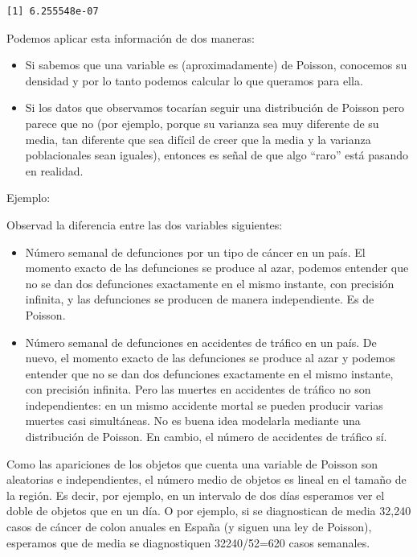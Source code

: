 \documentclass[
  spanish,
  letterpaper,
  DIV=11,
  numbers=noendperiod]{scrreprt}
\begin{document}
\begin{verbatim}
[1] 6.255548e-07
\end{verbatim}

Podemos aplicar esta información de dos maneras:

\begin{itemize}
\item
  Si sabemos que una variable es (aproximadamente) de Poisson, conocemos
  su densidad y por lo tanto podemos calcular lo que queramos para ella.
\item
  Si los datos que observamos tocarían seguir una distribución de
  Poisson pero parece que no (por ejemplo, porque su varianza sea muy
  diferente de su media, tan diferente que sea difícil de creer que la
  media y la varianza poblacionales sean iguales), entonces es señal de
  que algo ``raro'' está pasando en realidad.
\end{itemize}

Ejemplo:

Observad la diferencia entre las dos variables siguientes:

\begin{itemize}
\item
  Número semanal de defunciones por un tipo de cáncer en un país. El
  momento exacto de las defunciones se produce al azar, podemos entender
  que no se dan dos defunciones exactamente en el mismo instante, con
  precisión infinita, y las defunciones se producen de manera
  independiente. Es de Poisson.
\item
  Número semanal de defunciones en accidentes de tráfico en un país. De
  nuevo, el momento exacto de las defunciones se produce al azar y
  podemos entender que no se dan dos defunciones exactamente en el mismo
  instante, con precisión infinita. Pero las muertes en accidentes de
  tráfico no son independientes: en un mismo accidente mortal se pueden
  producir varias muertes casi simultáneas. No es buena idea modelarla
  mediante una distribución de Poisson. En cambio, el número de
  accidentes de tráfico sí.
\end{itemize}

\begin{tcolorbox}[enhanced jigsaw, arc=.35mm, bottomrule=.15mm, bottomtitle=1mm, breakable, colback=white, colbacktitle=quarto-callout-note-color!10!white, colframe=quarto-callout-note-color-frame, coltitle=black, left=2mm, leftrule=.75mm, opacityback=0, opacitybacktitle=0.6, rightrule=.15mm, title=\textcolor{quarto-callout-note-color}{\faInfo}\hspace{0.5em}{Nota}, titlerule=0mm, toprule=.15mm, toptitle=1mm]

Como las apariciones de los objetos que cuenta una variable de Poisson
son aleatorias e independientes, el número medio de objetos es lineal en
el tamaño de la región. Es decir, por ejemplo, en un intervalo de dos
días esperamos ver el doble de objetos que en un día. O por ejemplo, si
se diagnostican de media 32,240 casos de cáncer de colon anuales en
España (y siguen una ley de Poisson), esperamos que de media se
diagnostiquen 32240/52=620 casos semanales.

\end{tcolorbox}
\end{document}

